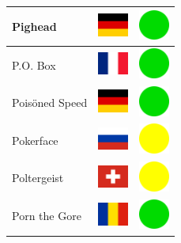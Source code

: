 \documentclass[12pt, a4paper, twoside]{report}
\begin{document}
\begin{center}
\begin{longtable}{|p{5cm}|p{2cm}|p{2cm}|}
			Pighead & \includegraphics[width=1cm]{4x3/de} & \includegraphics[width=1cm]{likes/y} \\ \hline
			P.O. Box & \includegraphics[width=1cm]{4x3/fr} & \includegraphics[width=1cm]{likes/y} \\ \hline
			Poisöned Speed & \includegraphics[width=1cm]{4x3/de} & \includegraphics[width=1cm]{likes/y} \\ \hline
			Pokerface & \includegraphics[width=1cm]{4x3/ru} & \includegraphics[width=1cm]{likes/m} \\ \hline
			Poltergeist & \includegraphics[width=1cm]{4x3/ch} & \includegraphics[width=1cm]{likes/m} \\ \hline
			Porn the Gore & \includegraphics[width=1cm]{4x3/ro} & \includegraphics[width=1cm]{likes/y} \\ \hline

\end{longtable}
\end{center}
\end{document}
